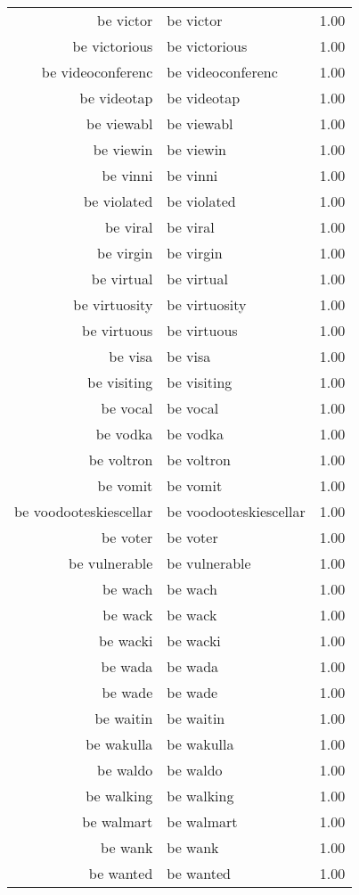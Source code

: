 \begin{table}[ht]
\begin{tabular}{rlr}
  be victor & be victor & 1.00 \\ 
  be victorious & be victorious & 1.00 \\ 
  be videoconferenc & be videoconferenc & 1.00 \\ 
  be videotap & be videotap & 1.00 \\ 
  be viewabl & be viewabl & 1.00 \\ 
  be viewin & be viewin & 1.00 \\ 
  be vinni & be vinni & 1.00 \\ 
  be violated & be violated & 1.00 \\ 
  be viral & be viral & 1.00 \\ 
  be virgin & be virgin & 1.00 \\ 
  be virtual & be virtual & 1.00 \\ 
  be virtuosity & be virtuosity & 1.00 \\ 
  be virtuous & be virtuous & 1.00 \\ 
  be visa & be visa & 1.00 \\ 
  be visiting & be visiting & 1.00 \\ 
  be vocal & be vocal & 1.00 \\ 
  be vodka & be vodka & 1.00 \\ 
  be voltron & be voltron & 1.00 \\ 
  be vomit & be vomit & 1.00 \\ 
  be voodooteskiescellar & be voodooteskiescellar & 1.00 \\ 
  be voter & be voter & 1.00 \\ 
  be vulnerable & be vulnerable & 1.00 \\ 
  be wach & be wach & 1.00 \\ 
  be wack & be wack & 1.00 \\ 
  be wacki & be wacki & 1.00 \\ 
  be wada & be wada & 1.00 \\ 
  be wade & be wade & 1.00 \\ 
  be waitin & be waitin & 1.00 \\ 
  be wakulla & be wakulla & 1.00 \\ 
  be waldo & be waldo & 1.00 \\ 
  be walking & be walking & 1.00 \\ 
  be walmart & be walmart & 1.00 \\ 
  be wank & be wank & 1.00 \\ 
  be wanted & be wanted & 1.00 \\ 

\end{tabular}
\end{table}
